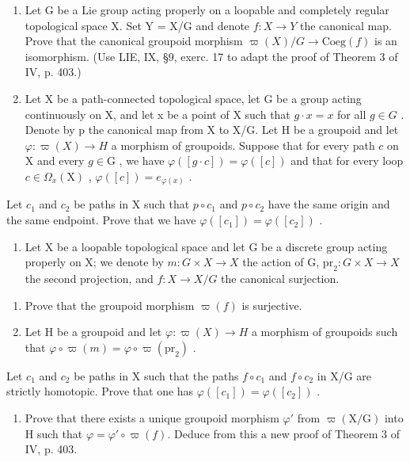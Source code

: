\begin{enumerate}
\def\labelenumi{\arabic{enumi})}
\setcounter{enumi}{4}
\item
  Let G be a Lie group acting properly on a loopable and completely regular topological space X. Set Y = X/G and denote \(f: X \to Y\) the canonical map. Prove that the canonical groupoid morphism \(\varpi(X)/G \to \text{Coeg}(f)\) is an isomorphism. (Use LIE, IX, §9, exerc. 17 to adapt the proof of Theorem 3 of IV, p. 403.)
\item
  Let X be a path-connected topological space, let G be a group acting continuously on X, and let x be a point of X such that \(g \cdot x = x\) for all \(g \in G\) . Denote by p the canonical map from X to X/G. Let H be a groupoid and let \(\varphi: \varpi(X) \to H\) a morphism of groupoids. Suppose that for every path \(c\) on \(\mathrm{X}\) and every \(g\in \mathrm{G}\) , we have \(\varphi ([g\cdot c]) = \varphi ([c])\) and that for every loop \(c\in \Omega_x(\mathrm{X})\) , \(\varphi ([c]) = e_{\varphi (x)}\) .
\end{enumerate}

Let \(c_{1}\) and \(c_{2}\) be paths in X such that \(p \circ c_{1}\) and \(p \circ c_{2}\) have the same origin and the same endpoint. Prove that we have \(\varphi([c_{1}]) = \varphi([c_{2}])\) .

\begin{enumerate}
\def\labelenumi{\arabic{enumi})}
\setcounter{enumi}{6}
\tightlist
\item
  Let X be a loopable topological space and let G be a discrete group acting properly on X; we denote by \(m\colon G \times X \to X\) the action of G, \(\mathrm{pr}_2\colon G \times X \to X\) the second projection, and \(f\colon X \to X / G\) the canonical surjection.
\end{enumerate}

\begin{enumerate}
\def\labelenumi{\alph{enumi})}
\item
  Prove that the groupoid morphism \(\varpi(f)\) is surjective.
\item
  Let H be a groupoid and let \(\varphi\colon\varpi(X)\to H\) a morphism of groupoids such that \(\varphi\circ\varpi(m)=\varphi\circ\varpi(\mathrm{pr}_{2})\) .
\end{enumerate}

Let \(c_{1}\) and \(c_{2}\) be paths in X such that the paths \(f \circ c_{1}\) and \(f \circ c_{2}\) in X/G are strictly homotopic. Prove that one has \(\varphi([c_{1}]) = \varphi([c_{2}])\) .

\begin{enumerate}
\def\labelenumi{\alph{enumi})}
\setcounter{enumi}{2}
\tightlist
\item
  Prove that there exists a unique groupoid morphism \(\varphi'\) from \(\varpi(\mathrm{X/G})\) into H such that \(\varphi = \varphi' \circ \varpi(f)\). Deduce from this a new proof of Theorem 3 of IV, p. 403.
\end{enumerate}

